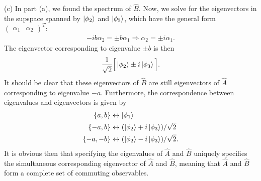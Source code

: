 {(c) In part (a), we found the spectrum of $\hat{B}$.
Now, we solve for the eigenvectors in the supspace spanned by $\ket{\phi_2}$ and $\ket{\phi_3}$, which have the general form $\begin{pmatrix} \alpha_1 & \alpha_2 \end{pmatrix}^{T}$:
\begin{eqnarray}
    -ib \alpha_2 = \pm b \alpha_1 \Rightarrow \alpha_2 = \pm i \alpha_1
.\end{eqnarray}
The eigenvector corresponding to eigenvalue $\pm b$ is then 
\begin{eqnarray}
    \frac{1}{\sqrt{2}} \Big[ \ket{\phi_2} \pm i \ket{\phi_3} \Big]
.\end{eqnarray}
It should be clear that these eigenvectors of $\hat{B}$ are still eigenvectors of $\hat{A}$ corresponding to eigenvalue $-a$.
Furthermore, the correspondence between eigenvalues and eigenvectors is given by
\begin{align}
    \{ a,b \} &\leftrightarrow \ket{\phi_1} \\
    \{ -a, b \}  &\leftrightarrow (\ket{\phi_2} + i \ket{\phi_3})/\sqrt{2} \\
    \{ -a,-b \}  &\leftrightarrow (\ket{\phi_2} - i\ket{\phi_3})/\sqrt{2}
.\end{align}
It is obvious then that specifying the eigenvalues of $\hat{A}$ and $\hat{B}$ uniquely specifies the simultaneous corresponding eigenvector of $\hat{A}$ and $\hat{B}$, meaning that $\hat{A}$ and $\hat{B}$ form a complete set of commuting observables.


}


